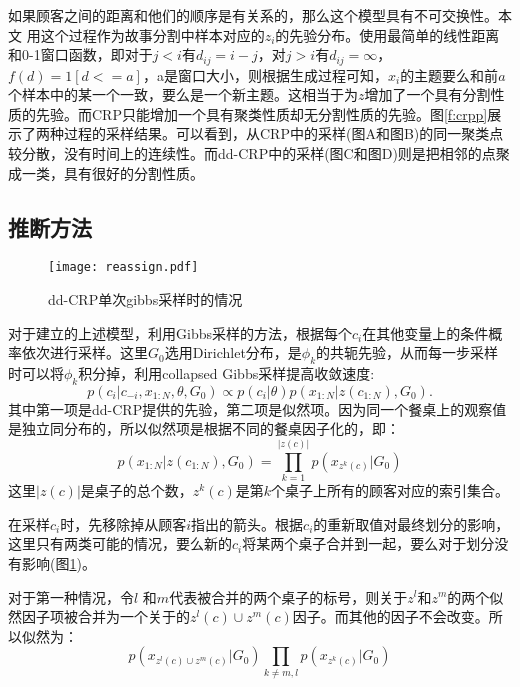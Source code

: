 如果顾客之间的距离和他们的顺序是有关系的，那么这个模型具有不可交换性。本文
用这个过程作为故事分割中样本对应的$z_i$的先验分布。使用最简单的线性距离和0-1窗口函数，即对于$j < i$有$d_{ij} = i - j$，对$j > i$有$d_{ij} = \infty$，$f(d) = 1[d <= a]$，a是窗口大小，则根据生成过程可知，$x_i$的主题要么和前$a$个样本中的某一个一致，要么是一个新主题。这相当于为$z$增加了一个具有分割性质的先验。而CRP只能增加一个具有聚类性质却无分割性质的先验。图\ref{f:crpp}展示了两种过程的采样结果。可以看到，从CRP中的采样(图A和图B)的同一聚类点较分散，没有时间上的连续性。而dd-CRP中的采样(图C和图D)则是把相邻的点聚成一类，具有很好的分割性质。

\subsection{推断方法}
\begin{figure}
  \begin{center}
  \quad\texttt{[image: reassign.pdf]}\\
  \end{center}
  \caption{dd-CRP单次gibbs采样时的情况}
  \label{fig:re}
\end{figure}
对于建立的上述模型，利用Gibbs采样的方法，根据每个$c_i$在其他变量上的条件概率依次进行采样。这里$G_0$选用Dirichlet分布，是$\phi_k$的共轭先验，从而每一步采样时可以将$\phi_k$积分掉，利用collapsed Gibbs采样提高收敛速度:
\begin{equation}p(c_i|c_{-i},x_{1:N},\theta,G_0)\propto p(c_i|\theta)p(x_{1:N}|z(c_{1:N}),G_0).\end{equation}
其中第一项是dd-CRP提供的先验，第二项是似然项。因为同一个餐桌上的观察值是独立同分布的，所以似然项是根据不同的餐桌因子化的，即：
\begin{equation}
p(x_{1:N}|z(c_{1:N}),G_0)=\prod_{k=1}^{|z(c)|}p(x_{z^{k}(c)}|G_0)\end{equation}
这里$|z(c)|$是桌子的总个数，$z^{k}(c)$是第$k$个桌子上所有的顾客对应的索引集合。

在采样$c_i$时，先移除掉从顾客$i$指出的箭头。根据$c_i$的重新取值对最终划分的影响，这里只有两类可能的情况，要么新的$c_i$将某两个桌子合并到一起，要么对于划分没有影响(图\ref{fig:re})。

对于第一种情况，令$l$ 和$m$代表被合并的两个桌子的标号，则关于$z^{l}$和$z^{m}$的两个似然因子项被合并为一个关于的$z^{l}(c)\cup z^{m}(c)$因子。而其他的因子不会改变。所以似然为：
\begin{equation}p(x_{z^{l}(c)\cup z^{m}(c)}|G_0)\prod_{k \ne m,l}p(x_{z^{k}(c)}|G_0)\end{equation}

